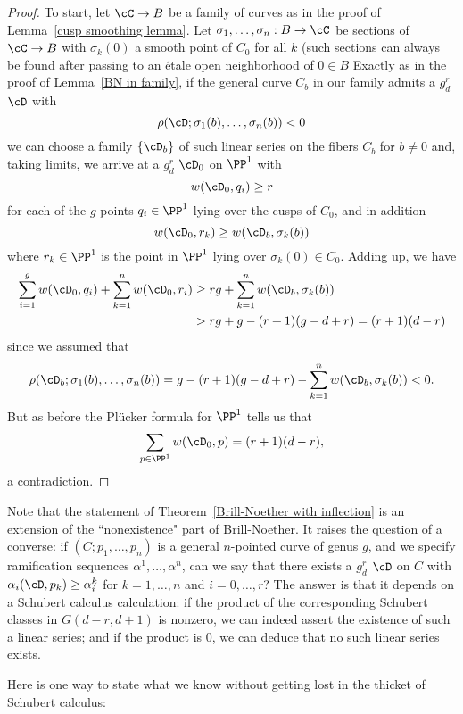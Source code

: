 \begin{proof}
To start, let $\cC \to B$ be a family of curves as in the proof of Lemma~\ref{cusp smoothing lemma}. Let $\sigma_1, \dots, \sigma_n : B \to \cC$ be sections of $\cC \to B$ with $\sigma_k(0)$ a smooth point of $C_0$ for all $k$ (such sections can always be found after passing to an \'etale open neighborhood of $0 \in B$ 
Exactly as in the proof of Lemma~\ref{BN in family}, if the general curve $C_b$ in our family admits a $g^r_d$ $\cD$ with
$$
\rho(\cD;\sigma_1(b),\dots,\sigma_n(b)) < 0
$$
we can choose a family $\{\cD_b\}$ of such linear series 
on the fibers $C_b$ for $b \neq 0$ and, taking limits, we arrive at a $g^r_d$ $\cD_0$ on $\PP^1$ with
$$
w(\cD_0, q_i) \geq r
$$
for each of the $g$ points $q_i \in \PP^1$ lying over the cusps of $C_0$, and in addition
$$
w(\cD_0, r_k) \geq w(\cD_b,\sigma_k(b))
$$
where $r_k \in \PP^1$ is the point in $\PP^1$ lying over $\sigma_k(0) \in C_0$. Adding up, we have
\begin{align*}
\sum_{i=1}^g w(\cD_0, q_i) + \sum_{k=1}^n w(\cD_0, r_i) &\geq rg + \sum_{k=1}^n w(\cD_b,\sigma_k(b)) \\
&> rg + g - (r+1)(g-d+r) = (r+1)(d-r)
\end{align*}
since we assumed that 
$$
\rho(\cD_b;\sigma_1(b),\dots,\sigma_n(b)) = g - (r+1)(g-d+r) - \sum_{k=1}^n w(\cD_b,\sigma_k(b)) < 0.
$$
But as before the Pl\"ucker formula for $\PP^1$ tells us that
$$
\sum_{p \in \PP^1} w(\cD_0, p) = (r+1)(d-r),
$$
a contradiction.
\end{proof}

Note that the statement of Theorem~\ref{Brill-Noether with inflection} is an extension of the ``nonexistence" part of Brill-Noether. It raises the question of a converse: if $(C;p_1,\dots,p_n)$ is a general $n$-pointed curve of genus $g$, and we specify ramification sequences $\alpha^1, \dots, \alpha^n$, can we say that there exists a $g^r_d$ $\cD$ on $C$ with $\alpha_i(\cD, p_k) \geq \alpha^k_i$ for $k=1,\dots,n$ and $i = 0, \dots, r$? The answer is that it depends on a Schubert calculus calculation: if the product of the corresponding Schubert classes in $G(d-r, d+1)$ is nonzero, we can indeed assert the existence of such a linear series; and if the product is 0, we can deduce that no such linear series exists.

Here is one way to state what we know without getting lost in the thicket of Schubert calculus:


